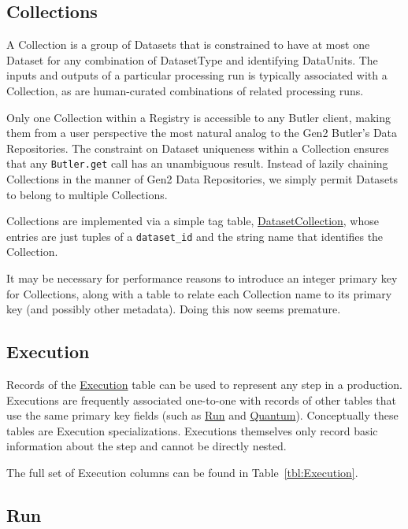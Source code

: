 \documentclass[DM,toc]{lsstdoc}
\newcommand{\tblref}[1]{\hyperref[tbl:#1]{#1}}
\newcommand{\coltable}[1]{
    \begin{table}[htb]
        {
            \footnotesize
            
        }
        \caption{#1 Columns}
        \label{tbl:#1}
    \end{table}
}
\begin{document}
\subsection{Collections}
\label{sec:collections}

A Collection is a group of Datasets that is constrained to have at most one Dataset for any combination of DatasetType and identifying DataUnits.
The inputs and outputs of a particular processing run is typically associated with a Collection, as are human-curated combinations of related processing runs.

Only one Collection within a Registry is accessible to any Butler client, making them from a user perspective the most natural analog to the Gen2 Butler's Data Repositories.
The constraint on Dataset uniqueness within a Collection ensures that any \texttt{Butler.get} call has an unambiguous result.
Instead of lazily chaining Collections in the manner of Gen2 Data Repositories, we simply permit Datasets to belong to multiple Collections.

Collections are implemented via a simple tag table, \tblref{DatasetCollection}, whose entries are just tuples of a \texttt{dataset\_id} and the string name that identifies the Collection.

It may be necessary for performance reasons to introduce an integer primary key for Collections, along with a table to relate each Collection name to its primary key (and possibly other metadata).
Doing this now seems premature.

\coltable{DatasetCollection}

\subsection{Execution}
\label{sec:excution}

Records of the \tblref{Execution} table can be used to represent any step in a production.
Executions are frequently associated one-to-one with records of other tables that use the same primary key fields (such as \hyperref[sec:run]{Run} and \hyperref[sec:quantum]{Quantum}).
Conceptually these tables are Execution specializations.
Executions themselves only record basic information about the step and cannot be directly nested.

The full set of Execution columns can be found in Table~\ref{tbl:Execution}.

\coltable{Execution}

\subsection{Run}
\label{sec:run}
\end{document}
